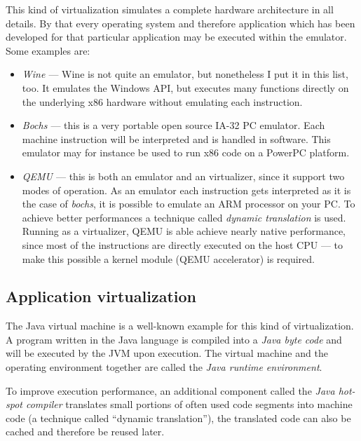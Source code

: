 This kind of virtualization  simulates a complete hardware architecture in
all  details. By  that every  operating system  and  therefore application
which has been  developed for that particular application  may be executed
within the emulator. Some examples are:
\begin{itemize}
\item  \emph{Wine \cite{wine}}  --- Wine  is  not quite  an emulator,  but
  nonetheless I put it in this list, too. It emulates the Windows API, but
  executes many functions directly  on the underlying x86 hardware without
  emulating each instruction.
\item \emph{Bochs  \cite{bochs}} --- this  is a very portable  open source
  IA-32 PC emulator.  Each machine  instruction will be interpreted and is
  handled in software.  This emulator may for instance be  used to run x86
  code on a PowerPC platform.
\item  \emph{QEMU  \cite{qemu}} ---  this  is  both  an emulator  and  an
  virtualizer, since  it support  two modes of  operation. As  an emulator
  each instruction  gets interpreted  as it is  the case  of \emph{bochs},
  \eg it is possible  to emulate an ARM processor on  your PC. To achieve
  better  performances a  technique called  \emph{dynamic  translation} is
  used.   Running as  a virtualizer,  QEMU is  able achieve  nearly native
  performance, since most of the instructions are directly executed on the
  host CPU --- to make this possible a kernel module (QEMU accelerator) is
  required.
\end{itemize}

\subsection{Application virtualization}
\label{sec:appl-level-virt}

The Java virtual machine \cite{java} is a well-known example for this kind
of virtualization. A program written in the Java language is compiled into
a  \emph{Java   byte  code}  and  will   be  executed  by   the  JVM  upon
execution. The virtual machine  and the operating environment together are
called the \emph{Java runtime environment}.

To  improve  execution performance,  an  additional  component called  the
\emph{Java hot-spot compiler} translates small portions of often used code
segments into  machine code (a technique  called ``dynamic translation''),
the translated code can also be cached and therefore be reused later.


